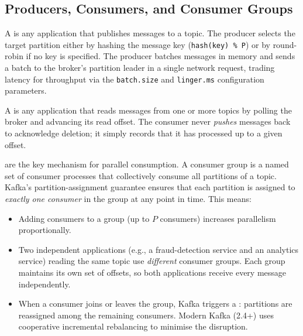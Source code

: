 \subsection{Producers, Consumers, and Consumer Groups}
\label{subsec:kafka-producers-consumers}

A  is any application that publishes messages to a
topic. The producer selects the target partition either by hashing the
message key (\texttt{hash(key) \% P}) or by round-robin if no key is
specified. The producer batches messages in memory and sends a batch
to the broker's partition leader in a single network request, trading
latency for throughput via the \texttt{batch.size} and \texttt{linger.ms}
configuration parameters.

A  is any application that reads messages from one
or more topics by polling the broker and advancing its read offset. The
consumer never \emph{pushes} messages back to acknowledge deletion; it
simply records that it has processed up to a given offset.

 are the key mechanism for parallel consumption.
A consumer group is a named set of consumer processes that collectively
consume all partitions of a topic. Kafka's partition-assignment guarantee
ensures that each partition is assigned to \emph{exactly one consumer}
in the group at any point in time. This means:
\begin{itemize}
  \item Adding consumers to a group (up to $P$ consumers) increases
        parallelism proportionally.
  \item Two independent applications (e.g., a fraud-detection service and
        an analytics service) reading the same topic use \emph{different}
        consumer groups. Each group maintains its own set of offsets,
        so both applications receive every message independently.
  \item When a consumer joins or leaves the group, Kafka triggers a
        : partitions are reassigned among the remaining
        consumers. Modern Kafka (2.4+) uses cooperative incremental
        rebalancing to minimise the disruption.
\end{itemize}


